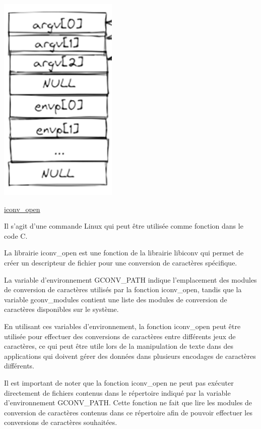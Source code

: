 \documentclass[12pt,a4paper]{article}
\begin{document}
\begin{flushleft}
\begin{center}
                    \includegraphics[scale=0.4]{pile_appel}
                \end{center}
            \item \underline{iconv\_open }
                \item Il s’agit d’une commande Linux qui peut être utilisée comme fonction dans le code C. 
                \item La librairie iconv\_open est une fonction de la librairie libiconv qui permet de créer un descripteur de fichier pour une conversion de caractères spécifique. 
                \item La variable d'environnement GCONV\_PATH indique l'emplacement des modules de conversion de caractères utilisés par la fonction iconv\_open, tandis que la variable gconv\_modules contient une liste des modules de conversion de caractères disponibles sur le système.
                \item En utilisant ces variables d'environnement, la fonction iconv\_open peut être utilisée pour effectuer des conversions de caractères entre différents jeux de caractères, ce qui peut être utile lors de la manipulation de texte dans des applications qui doivent gérer des données dans plusieurs encodages de caractères différents.
                \item Il est important de noter que la fonction iconv\_open ne peut pas exécuter directement de fichiers contenus dans le répertoire indiqué par la variable d'environnement GCONV\_PATH. Cette fonction ne fait que lire les modules de conversion de caractères contenus dans ce répertoire afin de pouvoir effectuer les conversions de caractères souhaitées.

\end{flushleft}
\end{document}
